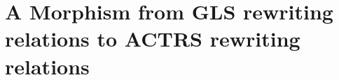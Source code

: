 \documentclass{book}
\begin{document}
% 


\chapter{A Morphism from GLS rewriting relations to ACTRS rewriting relations}

    \label{sec:morphism_from_gls_to_actrs}
    
\end{document}
